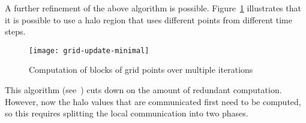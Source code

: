 A further refinement of the above algorithm is possible.
Figure~\ref{fig:grid-update-minimal} illustrates that it is possible
to use a halo region that uses different points from different time steps.
\begin{figure}[ht]
\texttt{[image: grid-update-minimal]}
\caption{Computation of blocks of grid points over multiple iterations}
\label{fig:grid-update-minimal}
\end{figure}
This algorithm (see~\cite{Demmel2008IEEE:avoiding}) cuts down on the amount
of redundant computation. However, now the halo values that are communicated
first need to be computed, so this requires splitting the local communication
into two phases.


